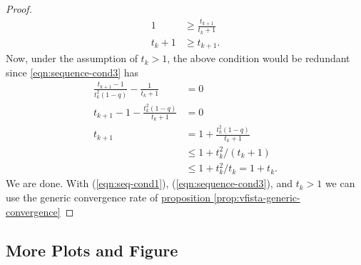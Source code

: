 \begin{proof}
\begin{align*}
            1 &\ge 
            \frac{t_{k + 1}}{t_k + 1}
            \\
            t_k + 1 &\ge t_{k + 1}. 
        \end{align*}
        Now, under the assumption of $t_k > 1$, the above condition would be redundant since \ref*{eqn:sequence-cond3} has 
        \begin{align*}
            \frac{t_{k + 1} - 1}{t_k^2(1 - q)}
            -
            \frac{1}{t_k + 1} &= 0
            \\
            t_{k + 1} - 1 - 
            \frac{t_k^2(1 - q)}{t_k + 1} &= 0
            \\
            t_{k + 1} &= 1 + 
            \frac{t_k^2(1 - q)}{t_k + 1}
            \\
            & \le 1 + t_k^2/(t_k + 1)
            \\
            &\le 1 + t_k^2/t_k = 1 + t_k. 
        \end{align*}
        We are done. 
        With (\ref*{eqn:seq-cond1}), (\ref*{eqn:sequence-cond3}), and $t_k > 1$ we can use the generic convergence rate of \hyperref[prop:vfista-generic-convergence]{proposition \ref*{prop:vfista-generic-convergence}}
    \end{proof}

\subsection{More Plots and Figure}


